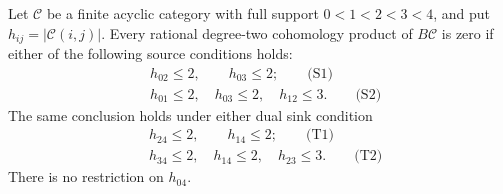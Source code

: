 \begin{proposition}
\label{A7:tree-stalk-profile}
Let $\mathcal C$ be a finite acyclic category with full support
$0<1<2<3<4$, and put $h_{ij}=|\mathcal C(i,j)|$.
Every rational degree-two cohomology product of $B\mathcal C$
is zero if either of the following source conditions holds:
\[
\begin{split}
 &h_{02}\leq2,\qquad h_{03}\leq2;\qquad\text{(S1)}\\
 &h_{01}\leq2,\quad h_{03}\leq2,
       \quad h_{12}\leq3.\qquad\text{(S2)}
\end{split}
\]
The same conclusion holds under either dual sink condition
\[
\begin{split}
 &h_{24}\leq2,\qquad h_{14}\leq2;\qquad\text{(T1)}\\
 &h_{34}\leq2,\quad h_{14}\leq2,
       \quad h_{23}\leq3.\qquad\text{(T2)}
\end{split}
\]
There is no restriction on $h_{04}$.
\end{proposition}

